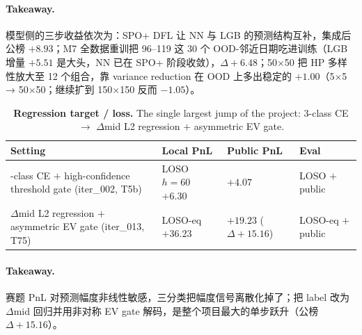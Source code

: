 \documentclass[11pt]{article}
\begin{document}
\paragraph{Takeaway.}
模型侧的三步收益依次为：SPO+ DFL 让 NN 与 LGB 的预测结构互补，集成后公榜 $+8.93$；M7 全数据重训把 96--119 这 30 个 OOD-邻近日期吃进训练（LGB 增量 $+5.51$ 是大头，NN 已在 SPO+ 阶段收敛），$\Delta+6.48$；50$\times$50 把 HP 多样性放大至 12 个组合，靠 variance reduction 在 OOD 上多出稳定的 $+1.00$（5$\times$5 → 50$\times$50；继续扩到 150$\times$150 反而 $-1.05$）。

\begin{table}[!htbp]
\centering
\caption{\textbf{Regression target / loss.} The single largest jump of the project: 3-class CE $\to$ $\Delta$mid L2 regression $+$ asymmetric EV gate.}
\label{tab:abl_target}
\setlength{\tabcolsep}{5pt}\renewcommand{\arraystretch}{1.15}
\small
\begin{tabularx}{\textwidth}{@{}>{\raggedright\arraybackslash}X >{\raggedleft\arraybackslash}p{2.6cm} >{\raggedleft\arraybackslash}p{2.6cm} >{\raggedright\arraybackslash}p{2.2cm}@{}}
\toprule
Setting & Local PnL & Public PnL & Eval \\
\midrule
3-class CE $+$ high-confidence threshold gate (iter\_002, T5b)                       & LOSO $h{=}60$ $+6.30$ & $+4.07$ & LOSO $+$ public \\
$\Delta$mid L2 regression $+$ asymmetric EV gate (iter\_013, T75)                    & LOSO-eq $+36.23$ & $+19.23$ ($\Delta+15.16$) & LOSO-eq $+$ public \\
\bottomrule
\end{tabularx}
\end{table}

\paragraph{Takeaway.}
赛题 PnL 对预测幅度非线性敏感，三分类把幅度信号离散化掉了；把 label 改为 $\Delta$mid 回归并用非对称 EV gate 解码，是整个项目最大的单步跃升（公榜 $\Delta+15.16$）。
\end{document}
